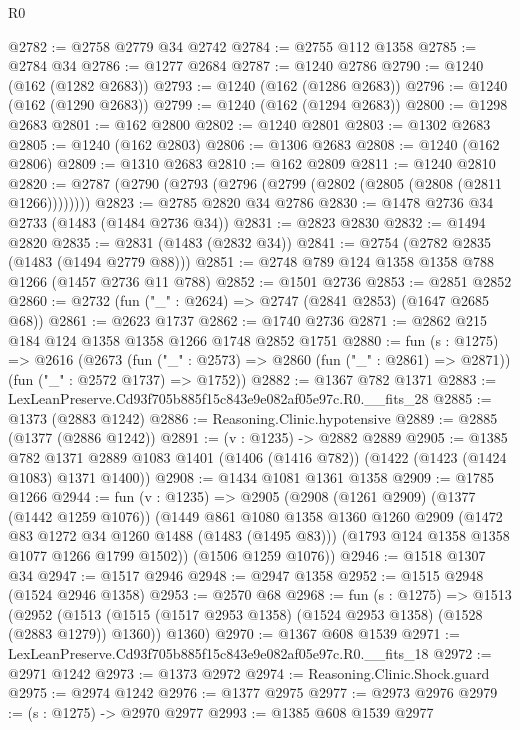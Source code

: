 \begin{lexlean}{R0}
\begin{coremodule}
@2782 := @2758 @2779 @34 @2742
@2784 := @2755 @112 @1358
@2785 := @2784 @34
@2786 := @1277 @2684
@2787 := @1240 @2786
@2790 := @1240 (@162 (@1282 @2683))
@2793 := @1240 (@162 (@1286 @2683))
@2796 := @1240 (@162 (@1290 @2683))
@2799 := @1240 (@162 (@1294 @2683))
@2800 := @1298 @2683
@2801 := @162 @2800
@2802 := @1240 @2801
@2803 := @1302 @2683
@2805 := @1240 (@162 @2803)
@2806 := @1306 @2683
@2808 := @1240 (@162 @2806)
@2809 := @1310 @2683
@2810 := @162 @2809
@2811 := @1240 @2810
@2820 := @2787 (@2790 (@2793 (@2796 (@2799 (@2802 (@2805 (@2808 (@2811 @1266))))))))
@2823 := @2785 @2820 @34 @2786
@2830 := @1478 @2736 @34 @2733 (@1483 (@1484 @2736 @34))
@2831 := @2823 @2830
@2832 := @1494 @2820
@2835 := @2831 (@1483 (@2832 @34))
@2841 := @2754 (@2782 @2835 (@1483 (@1494 @2779 @88)))
@2851 := @2748 @789 @124 @1358 @1358 @788 @1266 (@1457 @2736 @11 @788)
@2852 := @1501 @2736
@2853 := @2851 @2852
@2860 := @2732 (fun ("_" : @2624) => @2747 (@2841 @2853) (@1647 @2685 @68))
@2861 := @2623 @1737
@2862 := @1740 @2736
@2871 := @2862 @215 @184 @124 @1358 @1358 @1266 @1748 @2852 @1751
@2880 := fun (s : @1275) =>
  @2616
    (@2673
      (fun ("_" : @2573) => @2860 (fun ("_" : @2861) => @2871))
      (fun ("_" : @2572 @1737) => @1752))
@2882 := @1367 @782 @1371
@2883 := LexLeanPreserve.Cd93f705b885f15c843e9e082af05e97c.R0.__fits_28
@2885 := @1373 (@2883 @1242)
@2886 := Reasoning.Clinic.hypotensive
@2889 := @2885 (@1377 (@2886 @1242))
@2891 := (v : @1235) -> @2882 @2889
@2905 := @1385
    @782
    @1371
    @2889
    @1083
    @1401
    (@1406 (@1416 @782))
    (@1422 (@1423 (@1424 @1083) @1371 @1400))
@2908 := @1434 @1081 @1361 @1358
@2909 := @1785 @1266
@2944 := fun (v : @1235) =>
  @2905
    (@2908
      (@1261 @2909)
      (@1377 (@1442 @1259 @1076))
      (@1449
        @861
        @1080
        @1358
        @1360
        @1260
        @2909
        (@1472 @83 @1272 @34 @1260 @1488 (@1483 (@1495 @83)))
        (@1793 @124 @1358 @1358 @1077 @1266 @1799 @1502))
      (@1506 @1259 @1076))
@2946 := @1518 @1307 @34
@2947 := @1517 @2946
@2948 := @2947 @1358
@2952 := @1515 @2948 (@1524 @2946 @1358)
@2953 := @2570 @68
@2968 := fun (s : @1275) =>
  @1513
    (@2952
      (@1513 (@1515 (@1517 @2953 @1358) (@1524 @2953 @1358) (@1528 (@2883 @1279)) @1360))
      @1360)
@2970 := @1367 @608 @1539
@2971 := LexLeanPreserve.Cd93f705b885f15c843e9e082af05e97c.R0.__fits_18
@2972 := @2971 @1242
@2973 := @1373 @2972
@2974 := Reasoning.Clinic.Shock.guard
@2975 := @2974 @1242
@2976 := @1377 @2975
@2977 := @2973 @2976
@2979 := (s : @1275) -> @2970 @2977
@2993 := @1385
    @608
    @1539
    @2977

\end{coremodule}
\end{lexlean}
